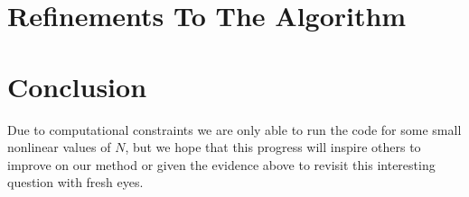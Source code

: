 \documentclass[11pt]{article}
\begin{document}
\section{Refinements To The Algorithm} \label{sec:refinements}


\section{Conclusion} \label{sec:conclusion}

Due to computational constraints we are only able to run the code for some small nonlinear values of $N$, but we hope that this progress will inspire others to improve on our method or given the evidence above to revisit this interesting question with fresh eyes.
\end{document}

